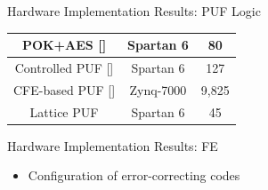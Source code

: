 \begin{frame}{Hardware Implementation Results: PUF Logic}
\begin{itemize}
\begin{table}[t!]
{\begin{tabular}{|c|c|c|}
        POK+AES []                    & Spartan 6 & 80                 \\ \hline
        Controlled PUF []             & Spartan 6 & 127                \\ \hline
        CFE-based PUF []  & Zynq-7000 & 9,825              \\ \hline
        Lattice PUF                                             & Spartan 6 & 45                 \\ \hline
        \end{tabular}
    }
    \vspace{-1em}
\end{table}

\end{itemize}
\end{frame}

\begin{frame}{Hardware Implementation Results: FE}
\begin{itemize}
    \item Configuration of error-correcting codes
    \begin{table}
    \centering
	\vspace{0.5em}
	\label{table:ecc}
	\def\arraystretch{1.1}
\end{table}


\end{itemize}
\end{frame}
